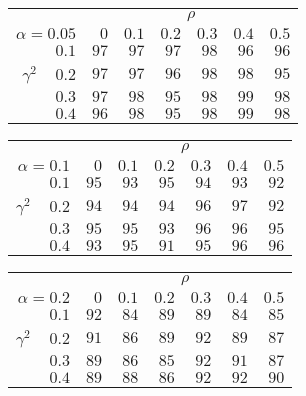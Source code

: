 \begin{tabular}{r|rrrrrr}
\hline\hline
 &\multicolumn{6}{c}{$\rho$} \\ 
 $\alpha = 0.05$ & $0$ & $0.1$ & $0.2$ & $0.3$ & $0.4$ & $0.5$ \\ 
 \hline$0.1$ & $97$ & $97$ & $97$ & $98$ & $96$ & $96$\\ 
$\gamma^2\;\;\;$ $0.2$ & $97$ & $97$ & $96$ & $98$ & $98$ & $95$\\ 
$0.3$ & $97$ & $98$ & $95$ & $98$ & $99$ & $98$\\ 
$0.4$ & $96$ & $98$ & $95$ & $98$ & $99$ & $98$\\ 
 \hline 
 \end{tabular}
 
 \vspace{2em} 
 
\begin{tabular}{r|rrrrrr}
\hline\hline
 &\multicolumn{6}{c}{$\rho$} \\ 
 $\alpha = 0.1$ & $0$ & $0.1$ & $0.2$ & $0.3$ & $0.4$ & $0.5$ \\ 
 \hline$0.1$ & $95$ & $93$ & $95$ & $94$ & $93$ & $92$\\ 
$\gamma^2\;\;\;$ $0.2$ & $94$ & $94$ & $94$ & $96$ & $97$ & $92$\\ 
$0.3$ & $95$ & $95$ & $93$ & $96$ & $96$ & $95$\\ 
$0.4$ & $93$ & $95$ & $91$ & $95$ & $96$ & $96$\\ 
 \hline 
 \end{tabular}
 
 \vspace{2em} 
 
\begin{tabular}{r|rrrrrr}
\hline\hline
 &\multicolumn{6}{c}{$\rho$} \\ 
 $\alpha = 0.2$ & $0$ & $0.1$ & $0.2$ & $0.3$ & $0.4$ & $0.5$ \\ 
 \hline$0.1$ & $92$ & $84$ & $89$ & $89$ & $84$ & $85$\\ 
$\gamma^2\;\;\;$ $0.2$ & $91$ & $86$ & $89$ & $92$ & $89$ & $87$\\ 
$0.3$ & $89$ & $86$ & $85$ & $92$ & $91$ & $87$\\ 
$0.4$ & $89$ & $88$ & $86$ & $92$ & $92$ & $90$\\ 
 \hline 
 \end{tabular}